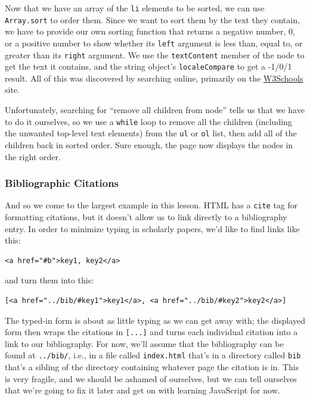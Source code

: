 Now that we have an array of the \texttt{li} elements to be sorted, we
can use \texttt{Array.sort} to order them. Since we want to sort them by
the text they contain, we have to provide our own sorting function that
returns a negative number, 0, or a positive number to show whether its
\texttt{left} argument is less than, equal to, or greater than its
\texttt{right} argument. We use the \texttt{textContent} member of the
node to get the text it contains, and the string object's
\texttt{localeCompare} to get a -1/0/1 result. All of this was
discovered by searching online, primarily on the
\href{https://www.w3schools.com/}{W3Schools} site.

Unfortunately, searching for ``remove all children from node'' tells us
that we have to do it ourselves, so we use a \texttt{while} loop to
remove all the children (including the unwanted top-level text elements)
from the \texttt{ul} or \texttt{ol} list, then add all of the children
back in sorted order. Sure enough, the page now displays the nodes in
the right order.

\hypertarget{s:pages-citations}{\subsubsection{Bibliographic
Citations}\label{s:pages-citations}}

And so we come to the largest example in this lesson. HTML has a
\texttt{cite} tag for formatting citations, but it doesn't allow us to
link directly to a bibliography entry. In order to minimize typing in
scholarly papers, we'd like to find links like this:

\begin{verbatim}
<a href="#b">key1, key2</a>
\end{verbatim}

and turn them into this:

\begin{verbatim}
[<a href="../bib/#key1">key1</a>, <a href="../bib/#key2">key2</a>]
\end{verbatim}

The typed-in form is about as little typing as we can get away with; the
displayed form then wraps the citations in \texttt{{[}...{]}} and turns
each individual citation into a link to our bibliography. For now, we'll
assume that the bibliography can be found at \texttt{../bib/}, i.e., in
a file called \texttt{index.html} that's in a directory called
\texttt{bib} that's a sibling of the directory containing whatever page
the citation is in. This is very fragile, and we should be ashamed of
ourselves, but we can tell ourselves that we're going to fix it later
and get on with learning JavaScript for now.


